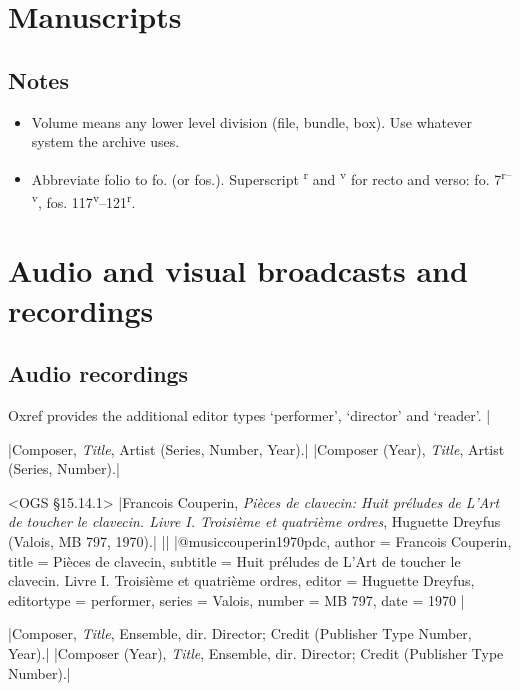 \documentclass[extrafontsizes,11pt,a4paper,oneside]{memoir}
\newcommand*{\lit}[1]{\textsf{#1}}
\newcommand*{\code}[1]{`\textsf{#1}'}
\begin{document}
\chapter{Manuscripts}\label{sec:ms}


\section{Notes}

\begin{itemize}
  \item Volume means any lower level division (file, bundle, box). Use whatever system the archive uses.
  \item Abbreviate folio to fo. (or fos.). Superscript \textsuperscript{r} and \textsuperscript{v} for recto and verso: fo. 7\textsuperscript{r--v}, fos. 117\textsuperscript{v}--121\textsuperscript{r}.
\end{itemize}

\chapter{Audio and visual broadcasts and recordings}\label{sec:audiovideo}

\section{Audio recordings}

Oxref provides the additional editor types \code{performer}, \code{director} and \code{reader}.
|

\specs
|Composer, \emph{Title}, Artist (Series, Number, Year).|%
|Composer (Year), \emph{Title}, Artist (Series, Number).|

\bibexample<OGS \S15.14.1>
|Francois Couperin, \emph{Pièces de clavecin: Huit préludes de L'Art de toucher le clavecin. Livre I. Troisième et quatrième ordres}, Huguette Dreyfus (Valois, MB 797, 1970).|%
||%
|@music{couperin1970pdc,
  author = {Francois Couperin},
  title = {Pièces de clavecin},
  subtitle = {Huit préludes de L'Art de toucher le clavecin. Livre I. Troisième et quatrième ordres},
  editor = {Huguette Dreyfus},
  editortype = {performer},
  series = {Valois},
  number = {MB 797},
  date = {1970}
}|

\specs
|Composer, \emph{Title}, Ensemble, \lit{dir.} Director; Credit (Publisher Type Number, Year).|%
|Composer (Year), \emph{Title}, Ensemble, \lit{dir.} Director; Credit (Publisher Type Number).|
\end{document}
